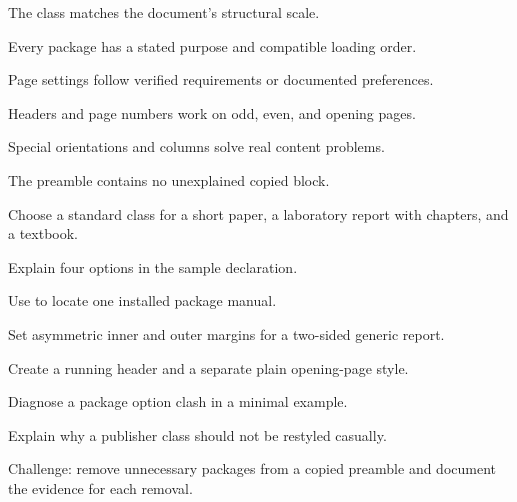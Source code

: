\chaptercheck
\begin{chapterchecklist}
  \item The class matches the document's structural scale.
  \item Every package has a stated purpose and compatible loading order.
  \item Page settings follow verified requirements or documented preferences.
  \item Headers and page numbers work on odd, even, and opening pages.
  \item Special orientations and columns solve real content problems.
  \item The preamble contains no unexplained copied block.
\end{chapterchecklist}

\chapterexercisestitle
\begin{chapterexercises}
  \item Choose a standard class for a short paper, a laboratory report with
        chapters, and a textbook.
  \item Explain four options in the sample  declaration.
  \item Use  to locate one installed package manual.
  \item Set asymmetric inner and outer margins for a two-sided generic report.
  \item Create a running header and a separate plain opening-page style.
  \item Diagnose a package option clash in a minimal example.
  \item Explain why a publisher class should not be restyled casually.
  \item Challenge: remove unnecessary packages from a copied preamble and
        document the evidence for each removal.
\end{chapterexercises}

